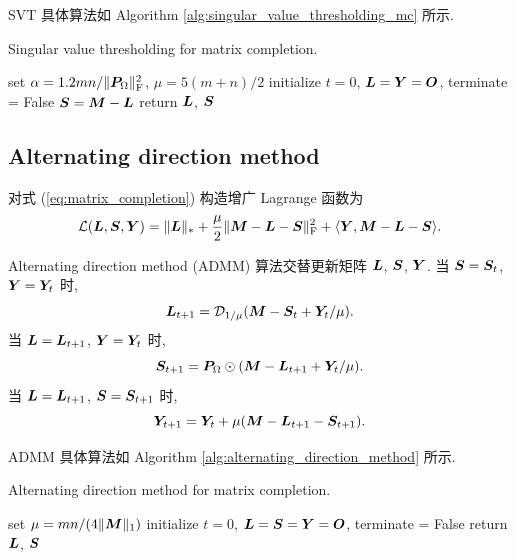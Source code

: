 \documentclass[12pt]{article}
\begin{document}
SVT 具体算法如 Algorithm \ref{alg:singular_value_thresholding_mc} 所示.

\begin{algorithm}[!htbp]
  \label{alg:singular_value_thresholding_mc}
  \caption{Singular value thresholding for matrix completion.}
  set $\alpha=1.2mn/\|\bm{P}_\Omega\|_{\text{F}}^2$, $\mu=5(m+n)/2$\;
  initialize $t=0$, $\bm{L}=\bm{Y}=\bm{O}$, terminate = False\;
  $\bm{S}=\bm{M}-\bm{L}$\;
  return $\bm{L}$, $\bm{S}$\;
\end{algorithm}

\subsection{Alternating direction method}

对式 (\ref{eq:matrix_completion}) 构造增广 Lagrange 函数为
\begin{equation}
  \mathcal{L}(\bm{L},\bm{S},\bm{Y})=\|\bm{L}\|_{*}+\frac{\mu}{2}\|\bm{M}-\bm{L}-\bm{S}\|_{\text{F}}^2+\langle\bm{Y},\bm{M}-\bm{L}-\bm{S}\rangle.
\end{equation}

Alternating direction method (ADMM) \cite{lin2010augmented} 算法交替更新矩阵 $\bm{L}$, $\bm{S}$, $\bm{Y}$. 当 $\bm{S}=\bm{S}_{t}$, $\bm{Y}=\bm{Y}_t$ 时,
\begin{equation}
  \bm{L}_{t+1}
  =\mathcal{D}_{1/\mu}(\bm{M}-\bm{S}_t+\bm{Y}_t/\mu).
\end{equation}
当 $\bm{L}=\bm{L}_{t+1}$, $\bm{Y}=\bm{Y}_t$ 时,
\begin{equation}
  \bm{S}_{t+1}
  =\bm{P}_\Omega\odot(\bm{M}-\bm{L}_{t+1}+\bm{Y}_t/\mu).
\end{equation}
当 $\bm{L}=\bm{L}_{t+1}$, $\bm{S}=\bm{S}_{t+1}$ 时,
\begin{equation}
  \bm{Y}_{t+1}
  =\bm{Y}_t+\mu(\bm{M}-\bm{L}_{t+1}-\bm{S}_{t+1}).
\end{equation}

ADMM 具体算法如 Algorithm \ref{alg:alternating_direction_method} 所示.

\begin{algorithm}[!htbp]
  \label{alg:alternating_direction_method}
  \caption{Alternating direction method for matrix completion.}
  set $\mu=mn/(4\|\bm{M}\|_1)$\;
  initialize $t=0$, $\bm{L}=\bm{S}=\bm{Y}=\bm{O}$, terminate = False\;
  return $\bm{L}$, $\bm{S}$\;
\end{algorithm}
\end{document}
